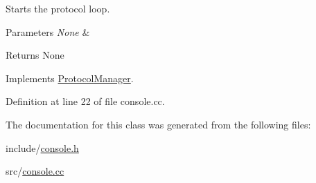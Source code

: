 Starts the protocol loop. 


\begin{DoxyParams}{Parameters}
{\em None} & \\
\hline
\end{DoxyParams}
\begin{DoxyReturn}{Returns}
None 
\end{DoxyReturn}


Implements \mbox{\hyperlink{classProtocolManager_aa3ae25a03e2f070ea486fd9319715a6a}{Protocol\+Manager}}.



Definition at line 22 of file console.\+cc.



The documentation for this class was generated from the following files\+:\begin{DoxyCompactItemize}
\item 
include/\mbox{\hyperlink{console_8h}{console.\+h}}\item 
src/\mbox{\hyperlink{console_8cc}{console.\+cc}}\end{DoxyCompactItemize}
